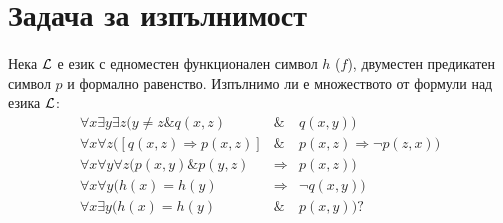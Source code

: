 \documentclass[12pt]{article}
\begin{document}
\newpage
\section{Задача за изпълнимост}
\paragraph{}

Нека ${\cal L}$ е език с едноместен функционален
символ $h$ ($f$), двуместен предикатен символ $p$ и формално равенство. 
Изпълнимо ли е множеството от формули над езика ${\cal L}$:
\begin{eqnarray*}
\forall x \exists y\exists z (y\neq z \& q(x,z)& \& &q(x,y))\\
\forall x \forall z ([q(x,z)\Rightarrow p(x,z)] &\&& p(x,z) \Rightarrow \neg p(z,x))\\
\forall x \forall y \forall z (p(x,y) \& p(y,z) &\Rightarrow &p(x,z)) \\
\forall x \forall y (h(x) = h(y) &\Rightarrow &\neg q(x,y)) \\
\forall x \exists y (h(x)=h(y) &\& & p(x,y))?
\end{eqnarray*}
\end{document}
